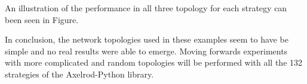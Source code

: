 An illustration of the performance in all three topology for each strategy can
been seen in Figure.


In conclusion, the network topologies used in these examples seem to have be
simple and no real results were able to emerge. Moving forwards experiments
with more complicated and random topologies will be performed with all the 132
strategies of the Axelrod-Python library.
